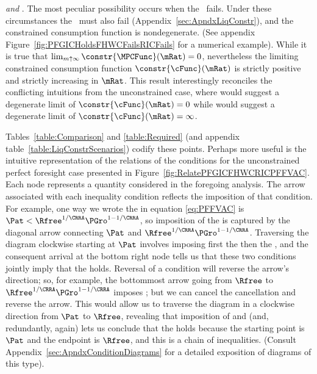 \documentclass[BufferStockTheory]{subfiles}
\begin{document}
\hypertarget{RICandFHWCFail}{}
\textit{{\PFGIC} and {\cncl{\RIC}}}.  
The most peculiar possibility occurs when the \RIC~fails.  Under these circumstances the \FHWC~must also fail (Appendix~\ref{sec:ApndxLiqConstr}), and the constrained consumption function is nondegenerate.  (See appendix Figure~\ref{fig:PFGICHoldsFHWCFailsRICFails} for a numerical example).  While it is true that $\lim_{m \uparrow \infty}
\constr{\MPCFunc}(\mRat) = 0$, nevertheless the limiting constrained
consumption function $\constr{\cFunc}(\mRat)$ is strictly positive
and strictly increasing in $\mRat$.  This result interestingly
reconciles the conflicting intuitions from the unconstrained case,
where \cncl{\RIC} would suggest a degenerate limit of
$\constr{\cFunc}(\mRat)=0$ while \cncl{\FHWC} would suggest a
degenerate limit of $\constr{\cFunc}(\mRat)=\infty$.

\hypertarget{RelatePFGICFHWCRICPFFVACText}{}
Tables~\ref{table:Comparison} and \ref{table:Required} (and appendix table~\ref{table:LiqConstrScenarios}) codify these points.  Perhaps more useful is the intuitive representation of the relations of the conditions for the unconstrained perfect foresight case presented in Figure~\ref{fig:RelatePFGICFHWCRICPFFVAC}.  Each node represents a quantity considered in the foregoing analysis.  The arrow associated with each inequality condition reflects the imposition of that condition.  For example, one way we wrote the {\PFFVAC} in equation \eqref{eq:PFFVAC} is $\Pat < \Rfree^{1/\CRRA} \PGro^{1-1/\CRRA}$, so imposition of the {\PFFVAC} is captured by the diagonal arrow connecting $\Pat$ and $\Rfree^{1/\CRRA}\PGro^{1-1/\CRRA}$.  Traversing the diagram clockwise starting at $\Pat$ involves imposing first the {\PFGIC} then the {\FHWC}, and the consequent arrival at the bottom right node tells us that these two conditions jointly imply that the {\PFFVAC} holds.  Reversal of a condition will reverse the arrow's direction; so, for example, the bottommost arrow going from $\Rfree$ to $\Rfree^{1/\CRRA}\PGro^{1-1/\CRRA}$ imposes {\cncl{\FHWC}}; but we can cancel the cancellation and reverse the arrow.  This would allow us to traverse the diagram in a clockwise direction from $\Pat$ to $\Rfree$, revealing that imposition of {\PFGIC} and {\FHWC} (and, redundantly, {\FHWC} again) lets us conclude that the {\RIC} holds because the starting point is $\Pat$ and the endpoint is $\Rfree$, and this is a chain of inequalities.  (Consult Appendix~\ref{sec:ApndxConditionDiagrams} for a detailed exposition of diagrams of this type).
\end{document}
